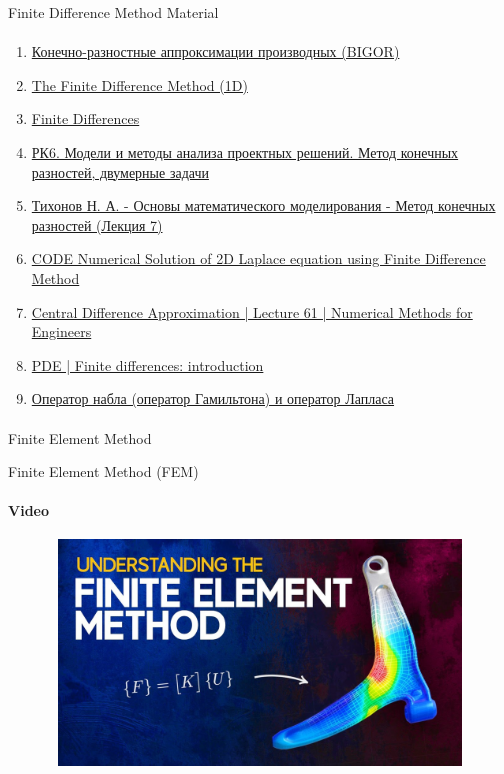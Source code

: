 \documentclass[aspectratio=169]{beamer}
\begin{document}
\begin{frame}[t]{Finite Difference Method Material}
    \framesubtitle{}
    \scriptsize
    \begin{enumerate}
        \item \href{http://bigor.bmstu.ru/?cnt/?doc=Mkr/\%CA\%D0.mod/?cou=Mkr/base.cou}{Конечно-разностные аппроксимации производных (BIGOR)}
        \item \href{https://youtu.be/to82dv2SX28}{The Finite Difference Method (1D)}
        \item \href{https://www.youtube.com/watch?v=YotrBNLFen0}{Finite Differences}
        \item \href{https://www.youtube.com/watch?v=zSz-c4lFAuQ&t=5s}{РК6. Модели и методы анализа проектных решений. Метод конечных разностей, двумерные задачи}
        \item \href{https://youtu.be/gIOLPO16mEU}{Тихонов Н. А. - Основы математического моделирования - Метод конечных разностей (Лекция 7)}
        \item \href{https://youtu.be/DWCNVF9oMkw}{CODE Numerical Solution of 2D Laplace equation using Finite Difference Method}
        \item \href{https://youtu.be/Tfo12ylAMso}{Central Difference Approximation | Lecture 61 | Numerical Methods for Engineers}
        \item \href{https://www.youtube.com/watch?v=g3Xw1r7QGOE}{PDE | Finite differences: introduction}
        \item \href{https://youtu.be/FS6FcaX1O0U}{Оператор набла (оператор Гамильтона) и оператор Лапласа}
    \end{enumerate}
\end{frame}

\begin{frame}[c]{}
    \framesubtitle{}
        \centering \LARGE Finite Element Method
\end{frame}

\begin{frame}[t]{Finite Element Method (FEM)}
    \framesubtitle{Video}
    \vspace{-0.6cm}
    \begin{figure}[H]
        \href{https://youtu.be/GHjopp47vvQ}{
            \centering\includegraphics[height=6cm,width=1\textwidth,keepaspectratio]{fem_video.jpg}}
        \label{fig:fem_video.jpg}
    \end{figure}
\end{frame}
\end{document}
